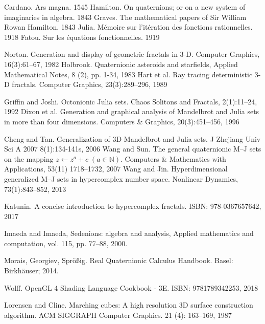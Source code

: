 \documentclass[12pt]{article}
\begin{document}
\pagebreak





\begin{thebibliography}{9}


 Cardano. Ars magna. 1545
 Hamilton. On quaternions; or on a new system of imaginaries in algebra. 1843
 Graves. The mathematical papers of Sir William Rowan Hamilton. 1843
 Julia. M\'emoire sur l'it\'eration des fonctions rationnelles. 1918
 Fatou. Sur les \'equations fonctionnelles. 1919

 Norton. Generation and display of geometric fractals in 3-D. Computer Graphics, 16(3):61–67, 1982
 Holbrook. Quaternionic asteroids and starfields, Applied Mathematical Notes, 8 (2), pp. 1-34, 1983
 Hart et al. Ray tracing deterministic 3-D fractals. Computer Graphics, 23(3):289–296, 1989

 Griffin and Joshi. Octonionic Julia sets. Chaos Solitons and Fractals, 2(1):11–24, 1992
 Dixon et al. Generation and graphical analysis of Mandelbrot and Julia sets in more than four dimensions. Computers \& Graphics, 20(3):451–456, 1996

 Cheng and Tan. Generalization of 3D Mandelbrot and Julia sets. J Zhejiang Univ Sci A 2007 8(1):134-141s, 2006
 Wang and Sun. The general quaternionic M–J sets on the mapping $z \leftarrow z^a + c\;(a \in \mathbb{N})$. Computers \& Mathematics with Applications, 53(11) 1718–1732, 2007
 Wang and Jin. Hyperdimensional generalized M–J sets in hypercomplex number space. Nonlinear Dynamics, 73(1):843–852, 2013

 Katunin. A concise introduction to hypercomplex fractals. ISBN: 978-0367657642, 2017

 Imaeda and Imaeda, Sedenions: algebra and analysis, Applied mathematics and computation, vol. 115, pp. 77–88, 2000.

 Morais, Georgiev, Spr{\"o}{\ss}ig. Real Quaternionic Calculus Handbook. Basel: Birkh{\"a}user; 2014.

 Wolff. OpenGL 4 Shading Language Cookbook - 3E. ISBN: 9781789342253, 2018

 Lorensen and Cline. Marching cubes: A high resolution 3D surface construction algorithm. ACM SIGGRAPH Computer Graphics. 21 (4): 163–169, 1987






\end{thebibliography}
\end{document}

